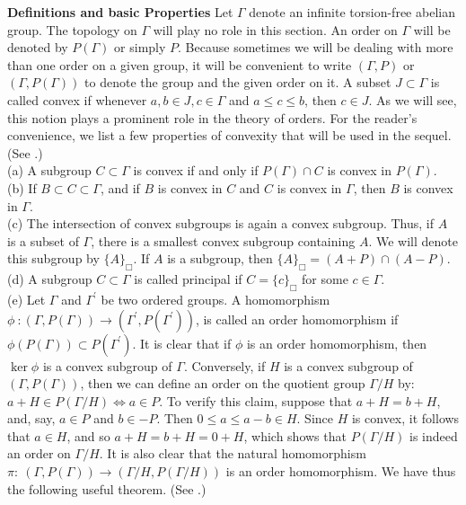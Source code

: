 {\bf Definitions and basic Properties} 
Let $\Gamma$ denote an infinite torsion-free
abelian group.  The topology on $\Gamma$ will play no role
in this section.  An order on $\Gamma$ will be denoted by
$P(\Gamma)$ or simply $P$.  Because sometimes we
will be dealing with more than one order
on a given group, it will be convenient
to write $(\Gamma,P)$ or $(\Gamma,P(\Gamma))$ 
to denote the group and the given order on it.
A subset $J\subset \Gamma$ is called convex
if whenever $a , b  \in J, c \in \Gamma$
and $a\leq c \leq b$, then $c\in J$.
As we will see, this notion plays a prominent 
role in the theory
of orders. For the reader's convenience, we list
a few properties of convexity 
that will be used 
in the sequel. 
(See \cite[pp. 18-19, and Chapter IV]{fu}.)\\
(a)  A subgroup $C\subset \Gamma$ is convex
if and only if $P(\Gamma)\cap C$ is convex in $P(\Gamma)$.\\
(b)  If $B\subset C\subset \Gamma$, and if
$B$ is convex in $C$ and $C$ is convex in $\Gamma$,
 then $B$ is convex in $\Gamma$.
\\
(c)  The intersection of convex subgroups is again
a convex subgroup.  Thus, if $A$ is a
subset of  $\Gamma$, there is a smallest
convex subgroup containing $A$.  We will denote
this subgroup by 
$\{A\}_\Box$.
If $A$ is a subgroup, then 
$\{A\}_\Box = (A+P)\cap (A-P)$.\\
(d)  A subgroup $C\subset \Gamma$ is called
principal if 
$C=\{c\}_\Box$ for some $c\in \Gamma$.\\
(e) Let $\Gamma$ and  
$\Gamma^\prime$ 
be two ordered groups.  A homomorphism 
$\phi \ : (\Gamma, P(\Gamma) ) \longrightarrow
 		(\Gamma^\prime, P(\Gamma^\prime) )$,
is called an order homomorphism if 
$\phi (P(\Gamma) )\subset P(\Gamma^\prime)$.
It is clear that if $\phi $ is an order homomorphism,
then $\ker \phi$ is a convex subgroup of
$\Gamma$.  Conversely, if $H$ is a 
convex subgroup of $(\Gamma, P(\Gamma) )$,
then we can define an order on the quotient group 
$\Gamma/H$ by:  $a+H\in P(\Gamma/H) \Leftrightarrow
a\in P$.  To verify this claim, 
suppose that  $a + H= b+H$, and, say, 
$a\in P$ and $b\in -P$.  
Then $0\leq a\leq a-b \in H$.  Since $H$ 
is convex, it follows that $a \in H$, and so 
$a+H=b+H=0+H$, which shows that
$ P(\Gamma/H)$ is indeed an order on  $\Gamma/H$.
It is also clear that the 
natural homomorphism 
$\pi :\ (\Gamma, P(\Gamma) )\longrightarrow 
(\Gamma/H, P(\Gamma/H) )$
is an order homomorphism.  We have thus the following 
useful theorem.  (See \cite[Theorem 7, p.21]{fu}.)
 		





